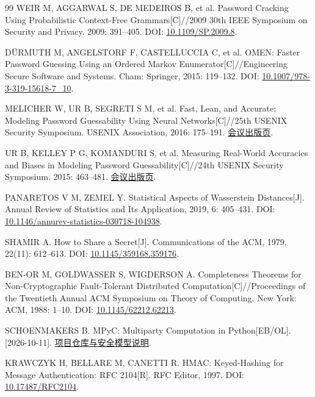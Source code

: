 \documentclass{crypto_report}
\begin{document}
\begin{thebibliography}{99}
 WEIR M, AGGARWAL S, DE MEDEIROS B, et al. Password Cracking
Using Probabilistic Context-Free Grammars{[}C{]}//2009 30th IEEE
Symposium on Security and Privacy. 2009: 391--405. DOI:
\href{https://doi.org/10.1109/SP.2009.8}{10.1109/SP.2009.8}.

 DÜRMUTH M, ANGELSTORF F, CASTELLUCCIA C, et al. OMEN: Faster Password Guessing Using an Ordered Markov Enumerator{[}C{]}//Engineering Secure Software and Systems. Cham: Springer, 2015: 119--132. DOI:
\href{https://doi.org/10.1007/978-3-319-15618-7_10}{10.1007/978-3-319-15618-7\_10}.

 MELICHER W, UR B, SEGRETI S M, et al. Fast, Lean, and Accurate: Modeling Password Guessability Using Neural Networks[C]//25th USENIX Security Symposium. USENIX Association, 2016: 175--191. \href{https://www.usenix.org/conference/usenixsecurity16/technical-sessions/presentation/melicher}{会议出版页}.

 UR B, KELLEY P G, KOMANDURI S, et al. Measuring Real-World
Accuracies and Biases in Modeling Password Guessability{[}C{]}//24th
USENIX Security Symposium. 2015: 463--481.
\href{https://www.usenix.org/conference/usenixsecurity15/technical-sessions/presentation/ur}{会议出版页}.

 PANARETOS V M, ZEMEL Y. Statistical Aspects of Wasserstein
Distances{[}J{]}. Annual Review of Statistics and Its Application, 2019,
6: 405--431. DOI:
\href{https://doi.org/10.1146/annurev-statistics-030718-104938}{10.1146/annurev-statistics-030718-104938}.

 SHAMIR A. How to Share a Secret[J]. Communications of the ACM, 1979, 22(11): 612--613. DOI: \href{https://doi.org/10.1145/359168.359176}{10.1145/359168.359176}.

 BEN-OR M, GOLDWASSER S, WIGDERSON A. Completeness Theorems for Non-Cryptographic Fault-Tolerant Distributed Computation[C]//Proceedings of the Twentieth Annual ACM Symposium on Theory of Computing. New York: ACM, 1988: 1--10. DOI: \href{https://doi.org/10.1145/62212.62213}{10.1145/62212.62213}.

 SCHOENMAKERS B. MPyC: Multiparty Computation in Python{[}EB/OL{]}. {[}2026-10-11{]}.
\href{https://github.com/lschoe/mpyc}{项目仓库与安全模型说明}.

 KRAWCZYK H, BELLARE M, CANETTI R. HMAC: Keyed-Hashing for Message Authentication: RFC 2104[R]. RFC Editor, 1997. DOI: \href{https://doi.org/10.17487/RFC2104}{10.17487/RFC2104}.


\end{thebibliography}
\end{document}

